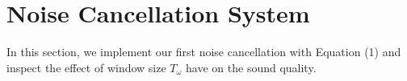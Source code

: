 \documentclass[journal]{IEEEtran}
\begin{document}
%
%


%




\section{Noise Cancellation System}
\begin{flushleft}
In this section, we implement our first noise cancellation with Equation (1) and inspect the effect of window size $T_\omega$ have on the sound quality. 
\end{flushleft}
\end{document}

